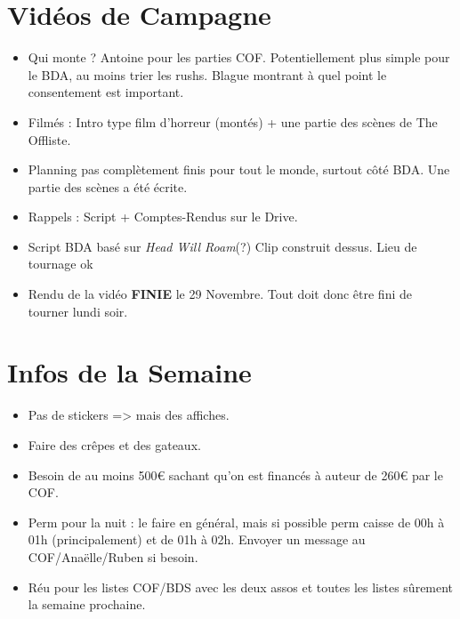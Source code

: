 \documentclass{article}
\begin{document}
\section{Vidéos de Campagne}
\begin{itemize}
    \item Qui monte ? Antoine pour les parties COF. Potentiellement plus simple pour le BDA, au moins trier les rushs. Blague montrant à quel point le consentement est important.
    \item Filmés : Intro type film d'horreur (montés) + une partie des scènes de The Offliste. 
    \item Planning pas complètement finis pour tout le monde, surtout côté BDA. Une partie des scènes a été écrite. 
    \item Rappels : Script + Comptes-Rendus sur le Drive. 
    \item Script BDA basé sur \textit{Head Will Roam}(?) Clip construit dessus. Lieu de tournage ok
    \item Rendu de la vidéo \textbf{FINIE} le 29 Novembre. Tout doit donc être fini de tourner lundi soir. 
\end{itemize}

\section{Infos de la Semaine}
\begin{itemize}
    \item Pas de stickers => mais des affiches.
    \item Faire des crêpes et des gateaux.
    \item Besoin de au moins 500€ sachant qu'on est financés à auteur de 260€ par le COF. 
    \item Perm pour la nuit : le faire en général, mais si possible perm caisse de 00h à 01h (principalement) et de 01h à 02h. Envoyer un message au COF/Anaëlle/Ruben si besoin. 
    \item Réu pour les listes COF/BDS avec les deux assos et toutes les listes sûrement la semaine prochaine.
\end{itemize}
\end{document}
